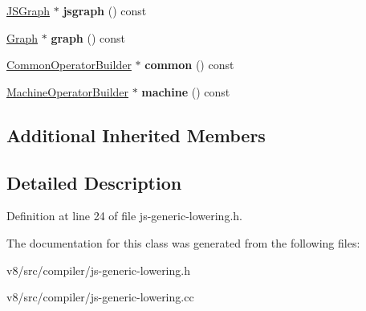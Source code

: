 \begin{DoxyCompactItemize}
\mbox{\hyperlink{classv8_1_1internal_1_1compiler_1_1JSGraph}{J\+S\+Graph}} $\ast$ {\bfseries jsgraph} () const
\item 
\mbox{\label{classv8_1_1internal_1_1compiler_1_1JSGenericLowering_a8fdf8ef67c34f7173e21a9e3af7ae690}} 
\mbox{\hyperlink{classv8_1_1internal_1_1compiler_1_1Graph}{Graph}} $\ast$ {\bfseries graph} () const
\item 
\mbox{\label{classv8_1_1internal_1_1compiler_1_1JSGenericLowering_a6e858f00d15393f90478cf00da749950}} 
\mbox{\hyperlink{classv8_1_1internal_1_1compiler_1_1CommonOperatorBuilder}{Common\+Operator\+Builder}} $\ast$ {\bfseries common} () const
\item 
\mbox{\label{classv8_1_1internal_1_1compiler_1_1JSGenericLowering_a759e46b0c04c91f9b9cd47c54d3c961a}} 
\mbox{\hyperlink{classv8_1_1internal_1_1compiler_1_1MachineOperatorBuilder}{Machine\+Operator\+Builder}} $\ast$ {\bfseries machine} () const
\end{DoxyCompactItemize}
\subsection*{Additional Inherited Members}


\subsection{Detailed Description}


Definition at line 24 of file js-\/generic-\/lowering.\+h.



The documentation for this class was generated from the following files\+:\begin{DoxyCompactItemize}
\item 
v8/src/compiler/js-\/generic-\/lowering.\+h\item 
v8/src/compiler/js-\/generic-\/lowering.\+cc\end{DoxyCompactItemize}
